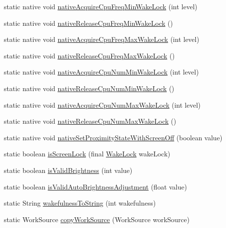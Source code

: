\begin{DoxyCompactItemize}
\item 
static native void \hyperlink{classcom_1_1android_1_1server_1_1power_1_1PowerManagerService_ae37459c0fe27439b31beab042babe2a8}{native\-Acquire\-Cpu\-Freq\-Min\-Wake\-Lock} (int level)
\item 
static native void \hyperlink{classcom_1_1android_1_1server_1_1power_1_1PowerManagerService_a750261ac7b125b7c9c950bf4c622032b}{native\-Release\-Cpu\-Freq\-Min\-Wake\-Lock} ()
\item 
static native void \hyperlink{classcom_1_1android_1_1server_1_1power_1_1PowerManagerService_ac1e5e58d120ca1702b1857e0510565b9}{native\-Acquire\-Cpu\-Freq\-Max\-Wake\-Lock} (int level)
\item 
static native void \hyperlink{classcom_1_1android_1_1server_1_1power_1_1PowerManagerService_a36f7e18ddb4b885f843758e1c1e997a0}{native\-Release\-Cpu\-Freq\-Max\-Wake\-Lock} ()
\item 
static native void \hyperlink{classcom_1_1android_1_1server_1_1power_1_1PowerManagerService_aff7d1ac8ab4f51048b8b627a943ec1ba}{native\-Acquire\-Cpu\-Num\-Min\-Wake\-Lock} (int level)
\item 
static native void \hyperlink{classcom_1_1android_1_1server_1_1power_1_1PowerManagerService_ac55cf5513bbe852edb7ed77027319e39}{native\-Release\-Cpu\-Num\-Min\-Wake\-Lock} ()
\item 
static native void \hyperlink{classcom_1_1android_1_1server_1_1power_1_1PowerManagerService_a596da73b038292457b3789e2dc185d03}{native\-Acquire\-Cpu\-Num\-Max\-Wake\-Lock} (int level)
\item 
static native void \hyperlink{classcom_1_1android_1_1server_1_1power_1_1PowerManagerService_a033633084ed18d7735dd115ca92bdb20}{native\-Release\-Cpu\-Num\-Max\-Wake\-Lock} ()
\item 
static native void \hyperlink{classcom_1_1android_1_1server_1_1power_1_1PowerManagerService_a935fae891149e7aa09584382c05520f7}{native\-Set\-Proximity\-State\-With\-Screen\-Off} (boolean value)
\item 
static boolean \hyperlink{classcom_1_1android_1_1server_1_1power_1_1PowerManagerService_a17708d5fc1c813813e949ad97648a2a3}{is\-Screen\-Lock} (final \hyperlink{classcom_1_1android_1_1server_1_1power_1_1PowerManagerService_1_1WakeLock}{Wake\-Lock} wake\-Lock)
\item 
static boolean \hyperlink{classcom_1_1android_1_1server_1_1power_1_1PowerManagerService_a2d8f9a25dbd9a8a827bccbe58c3f0831}{is\-Valid\-Brightness} (int value)
\item 
static boolean \hyperlink{classcom_1_1android_1_1server_1_1power_1_1PowerManagerService_a3e2e98dad235b0619922d39984863264}{is\-Valid\-Auto\-Brightness\-Adjustment} (float value)
\item 
static String \hyperlink{classcom_1_1android_1_1server_1_1power_1_1PowerManagerService_a63ed2a816b682eca0f3d24650fe7dbd8}{wakefulness\-To\-String} (int wakefulness)
\item 
static Work\-Source \hyperlink{classcom_1_1android_1_1server_1_1power_1_1PowerManagerService_a34fbb15121aaebb932695dcb81511734}{copy\-Work\-Source} (Work\-Source work\-Source)
\end{DoxyCompactItemize}
